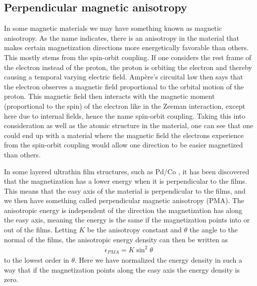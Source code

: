 \subsection{Perpendicular magnetic anisotropy} \label{sec:PMA}
In some magnetic materials we may have something known as magnetic anisotropy. As the name indicates, there is an anisotropy in the material that makes certain magnetization directions more energetically favorable than others. This mostly stems from the spin-orbit coupling. If one considers the rest frame of the electron instead of the proton, the proton is orbiting the electron and thereby causing a temporal varying electric field. Amp\`{e}re's circuital law then says that the electron observes a magnetic field proportional to the orbital motion of the proton. This magnetic field then interacts with the magnetic moment (proportional to the spin) of the electron like in the Zeeman interaction, except here due to internal fields, hence the name spin-orbit coupling. Taking this into consideration as well as the atomic structure in the material, one can see that one could end up with a material where the magnetic field the electrons experience from the spin-orbit coupling would allow one direction to be easier magnetized than others.

In some layered ultrathin film structures, such as Pd/Co \cite{Carcia1985}, it has been discovered that the magnetization has a lower energy when it is perpendicular to the films. This means that the easy axis of the material is perpendicular to the films, and we then have something called perpendicular magnetic anisotropy (PMA). The anisotropic energy is independent of the direction the magnetization has along the easy axis, meaning the energy is the same if the magnetization points into or out of the films. Letting $K$ be the anisotropy constant and $\theta$ the angle to the normal of the films, the anisotropic energy density can then be written as
\begin{align}
\epsilon_{PMA} = K\sin^2\theta \label{eq:PMADensity}
\end{align} 
to the lowest order in $\theta$. Here we have normalized the energy density in such a way that if the magnetization points along the easy axis the energy density is zero.

